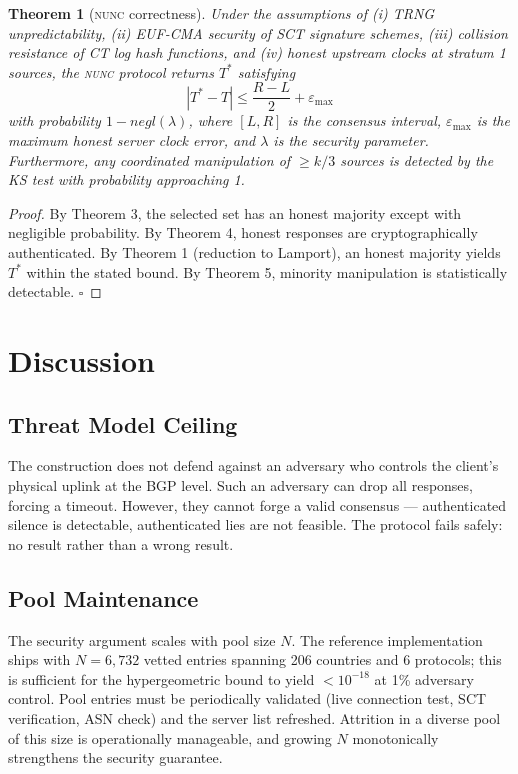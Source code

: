 \documentclass[11pt,twocolumn]{article}
\newtheorem{theorem}{Theorem}
\begin{document}
\begin{theorem}[\textsc{nunc} correctness]
  Under the assumptions of (i) TRNG unpredictability, (ii) EUF-CMA security
  of SCT signature schemes, (iii) collision resistance of CT log hash
  functions, and (iv) honest upstream clocks at stratum 1 sources, the
  \textsc{nunc} protocol returns $T^*$ satisfying
  \[
    |T^* - T| \leq \frac{R - L}{2} + \varepsilon_{\max}
  \]
  with probability $1 - \mathit{negl}(\lambda)$, where $[L, R]$ is the
  consensus interval, $\varepsilon_{\max}$ is the maximum honest server
  clock error, and $\lambda$ is the security parameter.  Furthermore, any
  coordinated manipulation of $\geq k/3$ sources is detected by the KS test
  with probability approaching 1.
\end{theorem}

\begin{proof}
  By Theorem 3, the selected set has an honest majority except with negligible
  probability.  By Theorem 4, honest responses are cryptographically
  authenticated.  By Theorem 1 (reduction to Lamport), an honest majority
  yields $T^*$ within the stated bound.  By Theorem 5, minority manipulation
  is statistically detectable.  $\square$
\end{proof}

\section{Discussion}

\subsection{Threat Model Ceiling}

The construction does not defend against an adversary who controls the
client's physical uplink at the BGP level.  Such an adversary can drop all
responses, forcing a timeout.  However, they cannot forge a valid consensus
— authenticated silence is detectable, authenticated lies are not feasible.
The protocol fails safely: no result rather than a wrong result.

\subsection{Pool Maintenance}

The security argument scales with pool size $N$.  The reference implementation
ships with $N = 6{,}732$ vetted entries spanning 206 countries and 6 protocols;
this is sufficient for the hypergeometric bound to yield $< 10^{-18}$ at 1\%
adversary control.  Pool entries must be periodically validated (live
connection test, SCT verification, ASN check) and the server list refreshed.
Attrition in a diverse pool of this size is operationally manageable, and
growing $N$ monotonically strengthens the security guarantee.
\end{document}
